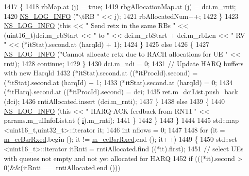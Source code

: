 \begin{DoxyCode}
1417                     \{
1418                       rbMap.at (j) = \textcolor{keyword}{true};
1419                       rbgAllocationMap.at (j) = dci.m\_rnti;
1420                       \hyperlink{group__logging_gafbd73ee2cf9f26b319f49086d8e860fb}{NS\_LOG\_INFO} (\textcolor{stringliteral}{"\(\backslash\)tRB "} << j);
1421                       rbAllocatedNum++;
1422                     \}
1423                   \hyperlink{group__logging_gafbd73ee2cf9f26b319f49086d8e860fb}{NS\_LOG\_INFO} (\textcolor{keyword}{this} << \textcolor{stringliteral}{" Send retx in the same RBs "} << (uint16\_t)dci.m\_rbStart 
      << \textcolor{stringliteral}{" to "} << dci.m\_rbStart + dci.m\_rbLen << \textcolor{stringliteral}{" RV "} << (*itStat).second.at (harqId) + 1);
1424                 \}
1425               \textcolor{keywordflow}{else}
1426                 \{
1427                   \hyperlink{group__logging_gafbd73ee2cf9f26b319f49086d8e860fb}{NS\_LOG\_INFO} (\textcolor{stringliteral}{"Cannot allocate retx due to RACH allocations for UE "} << rnti);
1428                   \textcolor{keywordflow}{continue};
1429                 \}
1430               dci.m\_ndi = 0;
1431               \textcolor{comment}{// Update HARQ buffers with new HarqId}
1432               (*itStat).second.at ((*itProcId).second) = (*itStat).second.at (harqId) + 1;
1433               (*itStat).second.at (harqId) = 0;
1434               (*itHarq).second.at ((*itProcId).second) = dci;
1435               ret.m\_dciList.push\_back (dci);
1436               rntiAllocated.insert (dci.m\_rnti);
1437             \}
1438             \textcolor{keywordflow}{else}
1439             \{
1440               \hyperlink{group__logging_gafbd73ee2cf9f26b319f49086d8e860fb}{NS\_LOG\_INFO} (\textcolor{keyword}{this} << \textcolor{stringliteral}{" HARQ-ACK feedback from RNTI "} << params.m\_ulInfoList.at (
      \hyperlink{bernuolliDistribution_8m_a6f6ccfcf58b31cb6412107d9d5281426}{i}).m\_rnti);
1441             \}
1442         \}
1443     \}
1444 
1445   std::map <uint16\_t,uint32\_t>::iterator it;
1446   \textcolor{keywordtype}{int} nflows = 0;
1447 
1448   \textcolor{keywordflow}{for} (it = \hyperlink{classns3_1_1TdMtFfMacScheduler_a06bec792095027e46fcf5281e4f4e77a}{m\_ceBsrRxed}.begin (); it != \hyperlink{classns3_1_1TdMtFfMacScheduler_a06bec792095027e46fcf5281e4f4e77a}{m\_ceBsrRxed}.end (); it++)
1449     \{
1450       std::set <uint16\_t>::iterator itRnti = rntiAllocated.find ((*it).first);
1451       \textcolor{comment}{// select UEs with queues not empty and not yet allocated for HARQ}
1452       \textcolor{keywordflow}{if} (((*it).second > 0)&&(itRnti == rntiAllocated.end ()))

\end{DoxyCode}
